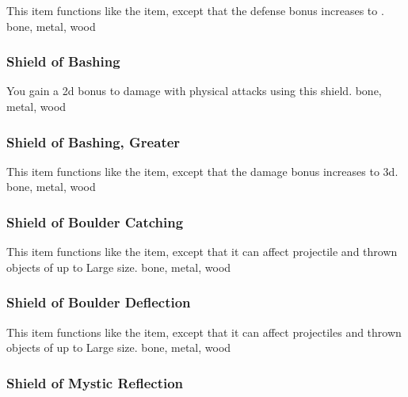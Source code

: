 This item functions like the  item, except that the defense bonus increases to .
 
 bone, metal, wood
\lowercase{\hypertarget{item:Shield of Bashing}{}}\label{item:Shield of Bashing}
\hypertarget{item:Shield of Bashing}{\subsubsection{Shield of Bashing\hfill{}}}
You gain a \plus2d bonus to damage with physical attacks using this shield.
 
 bone, metal, wood
\lowercase{\hypertarget{item:Shield of Bashing, Greater}{}}\label{item:Shield of Bashing, Greater}
\hypertarget{item:Shield of Bashing, Greater}{\subsubsection{Shield of Bashing, Greater\hfill{}}}
This item functions like the  item, except that the damage bonus increases to \plus3d.
 
 bone, metal, wood
\lowercase{\hypertarget{item:Shield of Boulder Catching}{}}\label{item:Shield of Boulder Catching}
\hypertarget{item:Shield of Boulder Catching}{\subsubsection{Shield of Boulder Catching\hfill{}}}
This item functions like the  item, except that it can affect projectile and thrown objects of up to Large size.
 
 bone, metal, wood
\lowercase{\hypertarget{item:Shield of Boulder Deflection}{}}\label{item:Shield of Boulder Deflection}
\hypertarget{item:Shield of Boulder Deflection}{\subsubsection{Shield of Boulder Deflection\hfill{}}}
This item functions like the  item, except that it can affect projectiles and thrown objects of up to Large size.
 
 bone, metal, wood
\lowercase{\hypertarget{item:Shield of Mystic Reflection}{}}\label{item:Shield of Mystic Reflection}
\hypertarget{item:Shield of Mystic Reflection}{\subsubsection{Shield of Mystic Reflection\hfill{}}}
